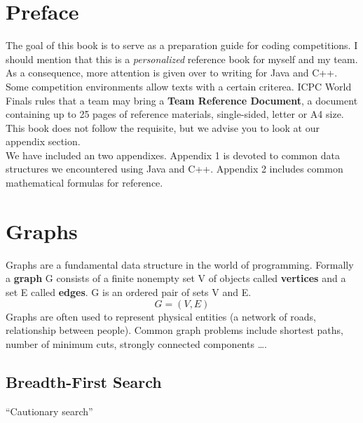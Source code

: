 \documentclass[]{book}
\author{}
\title{}
\date{}
\begin{document}
  \frontmatter
  \maketitle
  \chapter{Preface}
  \indent The goal of this book is to serve as a preparation guide for coding competitions.
  I should mention that this is a \textit{personalized} reference book for myself and my team.
  As a consequence, more attention is given over to writing for Java and C++.\\
  \indent Some competition environments allow texts with a certain criterea. ICPC World Finals
  rules that a team may bring a \textbf{Team Reference Document}, a document containing up to
  25 pages of reference materials, single-sided, letter or A4 size. This book does not
  follow the requisite, but we advise you to look at our appendix section.\\
  \indent We have included an two appendixes. Appendix 1 is devoted to common data structures we
  encountered using Java and C++. Appendix 2 includes common mathematical formulas for reference.

  \tableofcontents
  \mainmatter
  \chapter{Graphs}
  Graphs are a fundamental data structure in the world of programming. Formally
  a \textbf{graph} G consists of a finite nonempty set V of objects called \textbf{vertices}
  and a set E called \textbf{edges}. G is an ordered pair of sets V and E. $$ G = (V,E)$$
  \indent Graphs are often used to represent physical entities (a network of roads, relationship
  between people). Common graph problems include shortest paths, number of minimum cuts,
  strongly connected components \ldots.

  \section{Breadth-First Search}
  ``Cautionary search''
\end{document}
